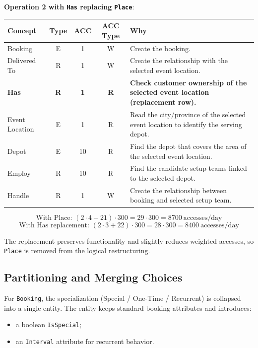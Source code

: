\textbf{Operation 2 with \texttt{Has} replacing \texttt{Place}}:

\begin{table}[H]
    \centering
    \begin{tabular}{|l|c|c|c|p{6.3cm}|}
    \hline
    \textbf{Concept} & \textbf{Type} & \textbf{ACC} & \textbf{ACC Type} & \textbf{Why} \\
    \hline
    Booking & E & 1 & W & Create the booking. \\
    \hline
    Delivered To & R & 1 & W & Create the relationship with the selected event location. \\
    \hline
    \textbf{Has} & \textbf{R} & \textbf{1} & \textbf{R} & \textbf{Check customer ownership of the selected event location (replacement row).} \\
    \hline
    Event Location & E & 1 & R & Read the city/province of the selected event location to identify the serving depot. \\
    \hline
    Depot & E & 10 & R & Find the depot that covers the area of the selected event location. \\
    \hline
    Employ & R & 10 & R & Find the candidate setup teams linked to the selected depot. \\
    \hline
    Handle & R & 1 & W & Create the relationship between booking and selected setup team. \\
    \hline
    \end{tabular}
\end{table}

\[
\text{With Place: } (2 \cdot 4 + 21) \cdot 300 = 29 \cdot 300 = 8700\ \text{accesses/day}
\]
\[
\text{With Has replacement: } (2 \cdot 3 + 22) \cdot 300 = 28 \cdot 300 = 8400\ \text{accesses/day}
\]

\noindent The replacement preserves functionality and slightly reduces weighted accesses, so \texttt{Place} is removed from the logical restructuring.

\subsection*{Partitioning and Merging Choices}

For \texttt{Booking}, the specialization (Special / One-Time / Recurrent) is collapsed into a single entity. The entity keeps standard booking attributes and introduces:

\begin{itemize}
    \item a boolean \texttt{IsSpecial};
    \item an \texttt{Interval} attribute for recurrent behavior.
\end{itemize}

